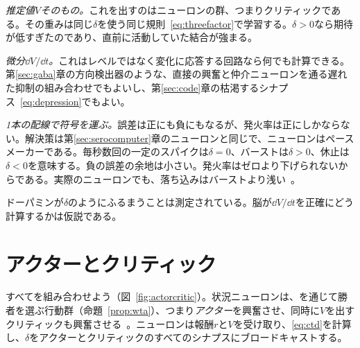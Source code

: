 \emph{推定値$V$そのもの。}これを出すのはニューロンの群、つまりクリティックである。その重みは同じ$\delta$を使う同じ規則~\eqref{eq:threefactor}で学習する。$\delta>0$なら期待が低すぎたのであり、直前に活動していた結合が強まる。

\emph{微分$\dd V/\dd t$。}これはレベルではなく変化に応答する回路なら何でも計算できる。第\ref{sec:gaba}章の方向検出器のような、直接の興奮と仲介ニューロンを通る遅れた抑制の組み合わせでもよいし、第\ref{sec:code}章の枯渇するシナプス~\eqref{eq:depression}でもよい。

\emph{1本の配線で符号を運ぶ。}誤差は正にも負にもなるが、発火率は正にしかならない。解決策は第\ref{sec:serocomputer}章のニューロンと同じで、ニューロンはペースメーカーである。毎秒数回の一定のスパイクは$\delta=0$、バーストは$\delta>0$、休止は$\delta<0$を意味する。負の誤差の余地は小さい。発火率はゼロより下げられないからである。実際のニューロンでも、落ち込みはバーストより浅い~\cite{Bayer2005}。

ドーパミンが$\delta$のようにふるまうことは測定されている。脳が$\dd V/\dd t$を正確にどう計算するかは仮説である。

\section{アクターとクリティック}

すべてを組み合わせよう（図~\ref{fig:actorcritic}）。状況ニューロンは、を通じて勝者を選ぶ行動群（命題~\ref{prop:wta}）、つまり\emph{アクター}を興奮させ、同時に$V$を出すクリティックも興奮させる~\cite{SuttonBarto2018}。ニューロンは報酬$r$と$V$を受け取り、\eqref{eq:ctd}を計算し、$\delta$をアクターとクリティックのすべてのシナプスにブロードキャストする。

